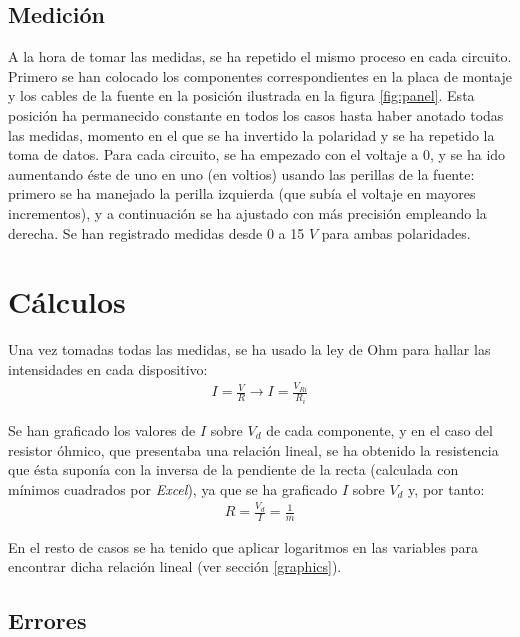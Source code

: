 \documentclass[fleqn,usenatbib,openbib]{mnras}
\begin{document}
\subsection{Medición}

A la hora de tomar las medidas, se ha repetido el mismo proceso en cada circuito. Primero se han colocado los componentes correspondientes en la placa de montaje y los cables de la fuente en la posición ilustrada en la figura \ref{fig:panel}. Esta posición ha permanecido constante en todos los casos hasta haber anotado todas las medidas, momento en el que se ha invertido la polaridad y se ha repetido la toma de datos. Para cada circuito, se ha empezado con el voltaje a 0, y se ha ido aumentando éste de uno en uno (en voltios) usando las perillas de la fuente: primero se ha manejado la perilla izquierda (que subía el voltaje en mayores incrementos), y a continuación se ha ajustado con más precisión empleando la derecha. Se han registrado medidas desde 0 a 15 $V$ para ambas polaridades.



\section{Cálculos}
\label{calculos}

Una vez tomadas todas las medidas, se ha usado la ley de Ohm para hallar las intensidades en cada dispositivo:
\begin{gather}
    I=\frac{V}{R} \rightarrow I =\frac{V_{Ri}}{R_i} \label{eq:ohm}
\end{gather}

Se han graficado los valores de $I$ sobre $V_d$ de cada componente, y en el caso del resistor óhmico, que presentaba una relación lineal, se ha obtenido la resistencia que ésta suponía con la inversa de la pendiente de la recta (calculada con mínimos cuadrados por \textit{Excel}), ya que se ha graficado $I$ sobre $V_d$ y, por tanto:
\begin{gather}
    R=\frac{V_d}{I}=\frac{1}{m} \label{eq:m}
\end{gather}

En el resto de casos se ha tenido que aplicar logaritmos en las variables para encontrar dicha relación lineal (ver sección \ref{graphics}). 


\subsection{Errores}
\end{document}
